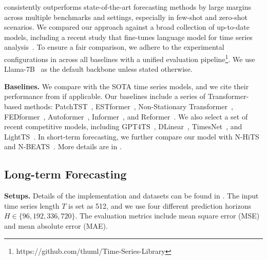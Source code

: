 \method consistently outperforms state-of-the-art forecasting methods by large margins across multiple benchmarks and settings, especially in few-shot and zero-shot scenarios. We compared our approach against a broad collection of up-to-date models, including a recent study that fine-tunes language model for time series analysis~\citep{zhou2023one}. To ensure a fair comparison, we adhere to the experimental configurations in \citep{wu2022timesnet} across all baselines with a unified evaluation pipeline\footnote{https://github.com/thuml/Time-Series-Library}. We use Llama-7B~\citep{touvron2023llama} as the default backbone unless stated otherwise.

\noindent\textbf{Baselines.}
We compare with the SOTA time series models, and we cite their performance from \citep{zhou2023one} if applicable. Our baselines include a series of Transformer-based methods: PatchTST~\citeyearpar{nie2022time}, ESTformer~\citeyearpar{woo2022etsformer}, Non-Stationary Transformer~\citeyearpar{liu2022non}, FEDformer~\citeyearpar{zhou2022fedformer}, Autoformer~\citeyearpar{wu2021autoformer}, Informer~\citeyearpar{zhou2021informer}, and Reformer~\citeyearpar{kitaev2020reformer}. We also select a set of recent competitive models, including GPT4TS~\citeyearpar{zhou2023one},  DLinear~\citeyearpar{zeng2023transformers}, TimesNet~\citeyearpar{wu2022timesnet}, and LightTS~\citeyearpar{zhang2022less}. In short-term forecasting, we further compare our model with N-HiTS~\citeyearpar{challu2023nhits} and N-BEATS~\citeyearpar{oreshkin2019n}. More details are in .

\vspace{-2mm}
\subsection{Long-term Forecasting} \label{sec:long-term-forecasting}
\vspace{-2mm}

\noindent\textbf{Setups.} 
Details of the implementation and datasets can be found in . The input time series length $T$ is set as 512, and we use four different prediction horizons $H \in \{96, 192, 336, 720\}$. The evaluation metrics include mean square error (MSE) and mean absolute error (MAE).

